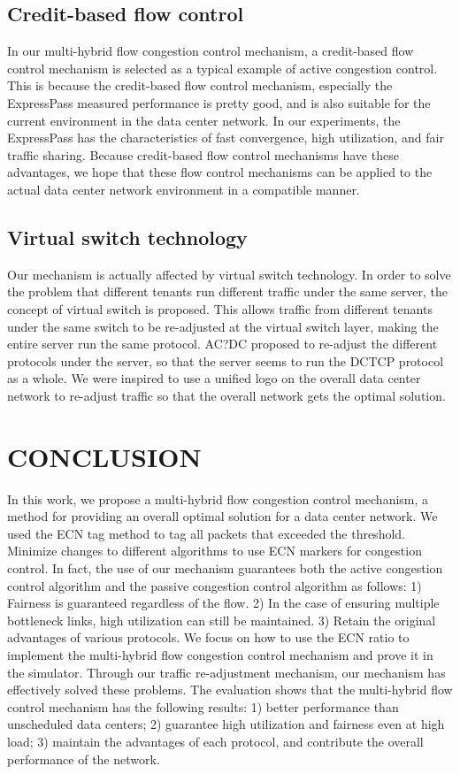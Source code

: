 \documentclass[conference]{IEEEtran}
\begin{document}
\subsection{Credit-based flow control}In our multi-hybrid flow congestion control mechanism, a credit-based flow control mechanism is selected as a typical example of active congestion control. This is because the credit-based flow control mechanism, especially the ExpressPass measured performance is pretty good, and is also suitable for the current environment in the data center network. In our experiments, the ExpressPass has the characteristics of fast convergence, high utilization, and fair traffic sharing. Because credit-based flow control mechanisms have these advantages, we hope that these flow control mechanisms can be applied to the actual data center network environment in a compatible manner.
\subsection{Virtual switch technology}Our mechanism is actually affected by virtual switch technology. In order to solve the problem that different tenants run different traffic under the same server, the concept of virtual switch is proposed. This allows traffic from different tenants under the same switch to be re-adjusted at the virtual switch layer, making the entire server run the same protocol. AC?DC proposed to re-adjust the different protocols under the server, so that the server seems to run the DCTCP protocol as a whole. We were inspired to use a unified logo on the overall data center network to re-adjust traffic so that the overall network gets the optimal solution.
\section{CONCLUSION}
In this work, we propose a multi-hybrid flow congestion control mechanism, a method for providing an overall optimal solution for a data center network. We used the ECN tag method to tag all packets that exceeded the threshold. Minimize changes to different algorithms to use ECN markers for congestion control. In fact, the use of our mechanism guarantees both the active congestion control algorithm and the passive congestion control algorithm as follows: 1) Fairness is guaranteed regardless of the flow. 2) In the case of ensuring multiple bottleneck links, high utilization can still be maintained. 3) Retain the original advantages of various protocols. We focus on how to use the ECN ratio to implement the multi-hybrid flow congestion control mechanism and prove it in the simulator. Through our traffic re-adjustment mechanism, our mechanism has effectively solved these problems. The evaluation shows that the multi-hybrid flow control mechanism has the following results: 1) better performance than unscheduled data centers; 2) guarantee high utilization and fairness even at high load; 3) maintain the advantages of each protocol, and contribute the overall performance of the network.
\end{document}
